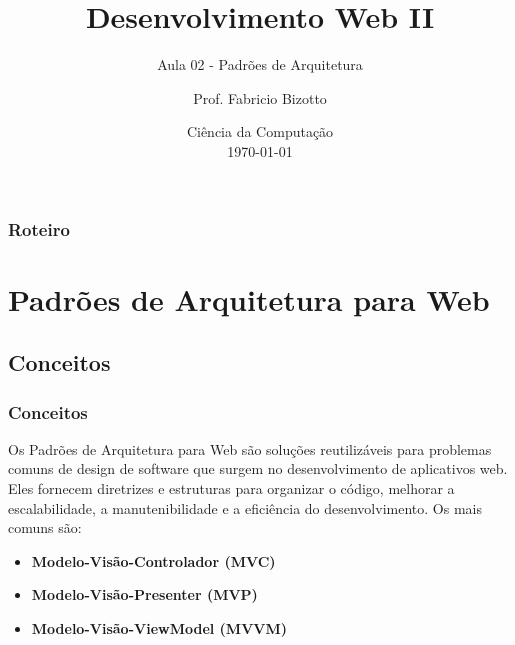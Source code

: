 \documentclass[
	10pt, %
	t, %
]{beamer}
\title[DesWebII]{Desenvolvimento Web II} %
\subtitle{Aula 02 - Padrões de Arquitetura} %
\author[Fabricio Bizotto]{Prof. Fabricio Bizotto} %
\institute[IFC]{Instituto Federal Catarinense \\ \smallskip \textit{fabricio.bizotto@ifc.edu.br}} %
\date[\today]{Ciência da Computação \\ \today} %
\begin{document}

\begin{frame}
	\titlepage %
\end{frame}


\begin{frame}
	\frametitle{Roteiro} %
	
	\tableofcontents %
\end{frame}


\section{Padrões de Arquitetura para Web} %


\subsection{Conceitos}

\begin{frame}
	\frametitle{Conceitos}
	
	Os \alert{Padrões de Arquitetura para Web} são soluções reutilizáveis para problemas comuns de design de software que surgem no desenvolvimento de aplicativos web. Eles fornecem \alert{diretrizes e estruturas} para organizar o código, melhorar a escalabilidade, a manutenibilidade e a eficiência do desenvolvimento. Os mais comuns são:

	\begin{itemize}
		\item \textbf{Modelo-Visão-Controlador (MVC)}
		\item \textbf{Modelo-Visão-Presenter (MVP)}
		\item \textbf{Modelo-Visão-ViewModel (MVVM)}
	\end{itemize}
\end{frame}
\end{document}
